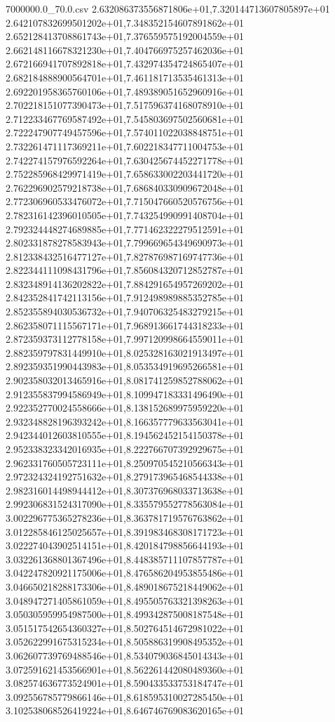 \begin{filecontents*}{7000000.0_70.0.csv}
2.632086373556871806e+01,7.320144713607805897e+01
2.642107832699501202e+01,7.348352154607891862e+01
2.652128413708861743e+01,7.376559575192004559e+01
2.662148116678321230e+01,7.404766975257462036e+01
2.672166941707892818e+01,7.432974354724865407e+01
2.682184888900564701e+01,7.461181713535461313e+01
2.692201958365760106e+01,7.489389051652960916e+01
2.702218151077390473e+01,7.517596374168078910e+01
2.712233467769587492e+01,7.545803697502560681e+01
2.722247907749457596e+01,7.574011022038848751e+01
2.732261471117369211e+01,7.602218347711004753e+01
2.742274157976592264e+01,7.630425674452271778e+01
2.752285968429971419e+01,7.658633002203441720e+01
2.762296902579218738e+01,7.686840330909672048e+01
2.772306960533476072e+01,7.715047660520576756e+01
2.782316142396010505e+01,7.743254990991408704e+01
2.792324448274689885e+01,7.771462322279512591e+01
2.802331878278583943e+01,7.799669654349690973e+01
2.812338432516477127e+01,7.827876987169747736e+01
2.822344111098431796e+01,7.856084320712852787e+01
2.832348914136202822e+01,7.884291654957269202e+01
2.842352841742113156e+01,7.912498989885352785e+01
2.852355894030536732e+01,7.940706325483279215e+01
2.862358071115567171e+01,7.968913661744318233e+01
2.872359373112778158e+01,7.997120998664559011e+01
2.882359797831449910e+01,8.025328163021913497e+01
2.892359351990443983e+01,8.053534919695266581e+01
2.902358032013465916e+01,8.081741259852788062e+01
2.912355837994586949e+01,8.109947183331496490e+01
2.922352770024558666e+01,8.138152689975959220e+01
2.932348828196393242e+01,8.166357779633563041e+01
2.942344012603810555e+01,8.194562452154150378e+01
2.952338323342016935e+01,8.222766707392929675e+01
2.962331760505723111e+01,8.250970545210566343e+01
2.972324324192751632e+01,8.279173965468544338e+01
2.982316014498944412e+01,8.307376968033713638e+01
2.992306831524317090e+01,8.335579552778563084e+01
3.002296775365278236e+01,8.363781719576763862e+01
3.012285846125025657e+01,8.391983468308171723e+01
3.022274043902514151e+01,8.420184798856644193e+01
3.032261368801367496e+01,8.448385711107857787e+01
3.042247820921175006e+01,8.476586204953855486e+01
3.046650218288173306e+01,8.489018675218449062e+01
3.048947271405861059e+01,8.495505763321398263e+01
3.050305959954987500e+01,8.499342875008187548e+01
3.051517542654360327e+01,8.502764514672981022e+01
3.052622991675315234e+01,8.505886319908495352e+01
3.062607739769488546e+01,8.534079036845014343e+01
3.072591621453566901e+01,8.562261442080489360e+01
3.082574636773524901e+01,8.590433533753184747e+01
3.092556785779866146e+01,8.618595310027285450e+01
3.102538068526419224e+01,8.646746769083620165e+01

\end{filecontents*}
